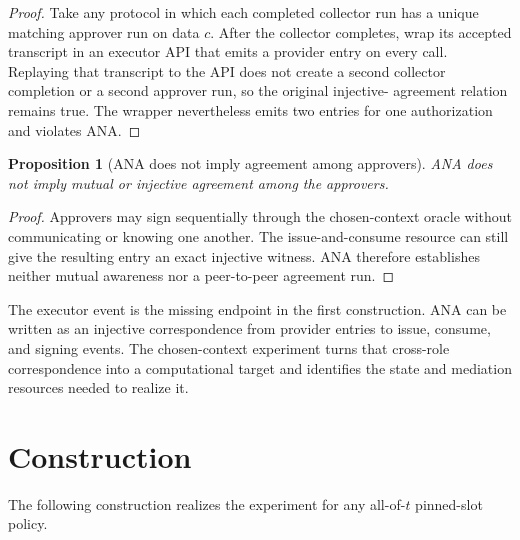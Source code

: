 \documentclass[10pt]{article}
\newtheorem{proposition}{Proposition}
\begin{document}
\begin{proof}
Take any protocol in which each completed collector run
has a unique matching approver run on data $c$. After the collector completes,
wrap its accepted transcript in an executor API that emits a provider entry on
every call. Replaying that transcript to the API does not create a second
collector completion or a second approver run, so the original injective-
agreement relation remains true. The wrapper nevertheless emits two entries for
one authorization and violates ANA.
\end{proof}

\begin{proposition}[ANA does not imply agreement among approvers]
\label{prop:ana-not-agreement}
ANA does not imply mutual or injective agreement among the approvers.
\end{proposition}

\begin{proof}
Approvers may sign sequentially through the chosen-context
oracle without communicating or knowing one another. The issue-and-consume
resource can still give the resulting entry an exact injective witness. ANA
therefore establishes neither mutual awareness nor a peer-to-peer agreement
run.
\end{proof}

The executor event is the missing endpoint in the first construction. ANA can
be written as an injective correspondence from provider entries to issue,
consume, and signing events. The chosen-context experiment turns that cross-role
correspondence into a computational target and identifies the state and
mediation resources needed to realize it.

\section{Construction}
\label{sec:construction}

The following construction realizes the experiment for any all-of-$t$ pinned-slot
policy.
\end{document}
